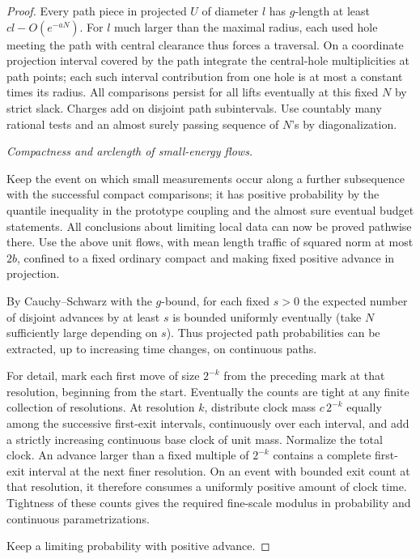 \begin{proof}
Every path piece in projected \(U\) of diameter \(l\) has \(g\)-length at least \(c l-O(e^{-aN})\).
For \(l\) much larger than the maximal radius, each used hole meeting the path with central
clearance thus forces a traversal. On a coordinate projection interval covered by the path integrate
the central-hole multiplicities at path points; each such interval contribution from one hole is at
most a constant times its radius. All comparisons persist for all lifts eventually at this fixed
\(N\) by strict slack. Charges add on disjoint path subintervals. Use countably many rational tests
and an almost surely passing sequence of \(N\)'s by diagonalization.

\smallskip\noindent\emph{Compactness and arclength of small-energy flows.}\par

Keep the event on which small measurements occur along a further subsequence with the successful
compact comparisons; it has positive probability by the quantile inequality in the prototype
coupling and the almost sure eventual budget statements. All conclusions about limiting local data
can now be proved pathwise there. Use the above unit flows, with mean length traffic of squared norm
at most \(2b\), confined to a fixed ordinary compact and making fixed positive advance in
projection.

By Cauchy–Schwarz with the \(g\)-bound, for each fixed \(s>0\) the expected number of disjoint
advances by at least \(s\) is bounded uniformly eventually (take \(N\) sufficiently large depending
on \(s\)). Thus projected path probabilities can be extracted, up to increasing time changes, on
continuous paths.

For detail, mark each first move of size \(2^{-k}\) from the preceding mark at that resolution,
beginning from the start. Eventually the counts are tight at any finite collection of resolutions.
At resolution \(k\), distribute clock mass \(c\,2^{-k}\) equally among the
successive first-exit intervals, continuously over each interval, and add a
strictly increasing continuous base clock of unit mass. Normalize the total
clock. An advance larger than a fixed multiple of \(2^{-k}\) contains a
complete first-exit interval at the next finer resolution. On an event with
bounded exit count at that resolution, it therefore consumes a uniformly
positive amount of clock time. Tightness of these counts gives the required
fine-scale modulus in probability and continuous parametrizations.

Keep a limiting probability with positive advance.


\end{proof}

